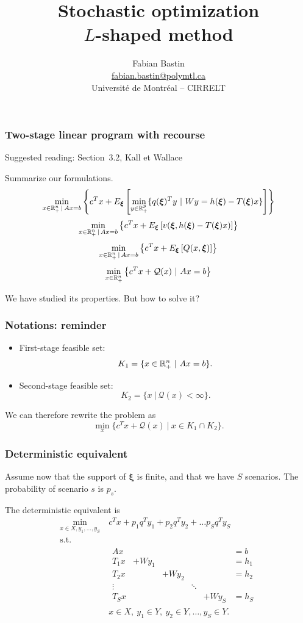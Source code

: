 \documentclass{beamer}
\title[$L$-shaped method]{Stochastic optimization\\$L$-shaped method}
\author[Fabian Bastin]{Fabian Bastin\\\url{fabian.bastin@polymtl.ca}\\Université de Montréal -- CIRRELT}
\date{}
\def\bxi{\boldsymbol\xi}
\begin{document}
\frame{\titlepage}

\begin{frame}
\frametitle{Two-stage linear program with recourse}

{\red Suggested reading: Section~3.2, Kall et Wallace}

\mbox{}

Summarize our formulations.
\[
\min_{x \in \rit^n_+ \,|\, Ax = b} \left\lbrace c^Tx + E_{\bxi} \left[ \min_{y \in \rit^p_+} \lbrace q(\bxi)^Ty \ |\ Wy = h(\bxi) - T(\bxi)x \rbrace \right] \right\rbrace 
\]
\[
\min_{x \in \rit^n_+ \,|\, Ax = b} \left\lbrace c^Tx + E_{\bxi}
  \left[  v(\bxi, h(\bxi)-T(\bxi)x) \right] \right\rbrace 
\]
\[
\min_{x \in \rit^n_+ \,|\, Ax = b} \left\lbrace c^Tx + E_{\bxi} \left[ Q(x,\bxi) \right] \right\rbrace 
\]
\[
\min_{x \in \mathbb{R}^n_+} \left\lbrace c^Tx + \mathcal{Q}(x)
  \ |\ Ax = b \right\rbrace 
\]

We have studied its properties. But how to solve it?

\end{frame}

\begin{frame}
\frametitle{Notations: reminder}

\begin{itemize}
\item
First-stage feasible set:
\[
K_1 = \lbrace x \in \mathbb{R}^n_+ \ |\ Ax = b \rbrace.
\]
\item
Second-stage feasible set:
\[
K_2 = \lbrace x \ |\ \mathcal{Q}(x) < \infty \rbrace.
\]
\end{itemize}
We can therefore rewrite the problem as
\[
\min_x \lbrace c^Tx + \mathcal{Q}(x) \ |\ x \in K_1 \cap K_2 \rbrace.
\]



\end{frame}

\begin{frame}
\frametitle{Deterministic equivalent}

Assume now that the support of $\bxi$ is finite, and that we have $S$ scenarios.
The probability of scenario $s$ is $p_s$.

\mbox{}

The deterministic equivalent is
\begin{align*}
\min_{x \in X, y_1, \ldots, y_S}\ & c^T x + p_1 q^T y_1 + p_2 q^T y_2 + \ldots
p_S q^Ty_S \\
\mbox{s.t. } & \\
& \begin{matrix} Ax & & & & & = b\\
T_1 x & + W y_1 & & & & = h_1 \\
T_2 x & & + W y_2 & & & = h_2 \\
\vdots & & & \ddots & \\
T_S x & & & & + W y_S & = h_S
\end{matrix} \\
& x \in X,\ y_1 \in Y,\ y_2 \in Y,\ldots, y_S \in Y.
\end{align*}

\end{frame}
\end{document}
